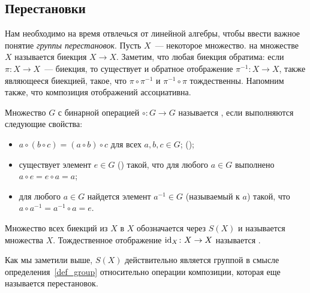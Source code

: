 

\subsection{Перестановки}\label{subsect:permutations}

Нам необходимо на время отвлечься от линейной алгебры, чтобы
ввести важное понятие {\it группы перестановок}.
Пусть $X$~--- некоторое
множество.  на множестве
$X$ называется биекция $X\to X$. Заметим, что любая биекция обратима:
если $\pi\colon X\to X$~--- биекция, то существует и обратное
отображение $\pi^{-1}\colon X\to X$, также являющееся биекцией, такое,
что $\pi\circ\pi^{-1}$ и $\pi^{-1}\circ\pi$ тождественны. Напомним
также, что композиция отображений ассоциативна.

\begin{definition}\label{def_group}
Множество $G$ с бинарной операцией $\circ\colon G\to G$ называется
, если выполняются следующие свойства:
\begin{itemize}
\item $a\circ (b\circ c)=(a\circ b)\circ c$ для всех $a,b,c\in G$;
  ();
\item существует элемент $e\in G$ () такой, что
  для любого $a\in G$
  выполнено $a\circ e=e\circ a=a$;
\item для любого $a\in G$ найдется элемент $a^{-1}\in G$ (называемый
   к $a$) такой, что
  $a\circ a^{-1}=a^{-1}\circ a=e$.
\end{itemize}
\end{definition}

\begin{definition}\label{def:symmetric_group}
Множество всех биекций из $X$ в $X$ обозначается через $S(X)$ и
называется 
множества $X$. Тождественное
отображение $\operatorname{id}_X\colon X\to X$ называется .
\end{definition}
Как мы заметили выше, $S(X)$ действительно является группой в смысле
определения~\ref{def_group} относительно операции композиции, которая
еще называется  перестановок.

